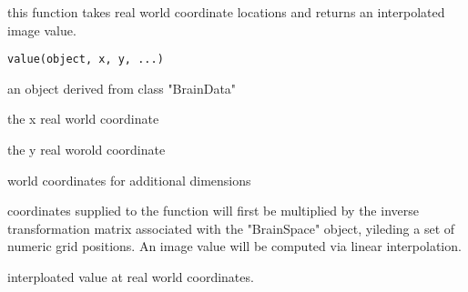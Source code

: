 \begin{Description}\relax
this function takes real world coordinate locations and returns an
interpolated image value.
\end{Description}
\begin{Usage}
\begin{verbatim}
value(object, x, y, ...)
\end{verbatim}
\end{Usage}
\begin{Arguments}
\begin{ldescription}
\item[\code{object}] an object derived from class "BrainData" 
\item[\code{x}] the x real world coordinate 
\item[\code{y}] the y real worold coordinate 
\item[\code{...}] world coordinates for additional dimensions 
\end{ldescription}
\end{Arguments}
\begin{Details}\relax
coordinates supplied to the function will first be multiplied by the
inverse transformation matrix associated with the "BrainSpace" object,
yileding a set of numeric grid positions. An image value will be
computed via linear interpolation.
\end{Details}
\begin{Value}
interploated value at real world coordinates.
\end{Value}

